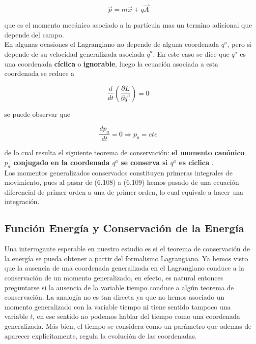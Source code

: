 \documentclass[12pt]{report}
\begin{document}
\begin{equation}
\vec{p}=m \vec{x} + q\vec{A}
\end{equation}


que es el momento mecánico asociado a la partícula mas un termino adicional que depende del campo. \\ 

En algunas ocasiones el Lagrangiano no depende de alguna coordenada $q^a$, pero si depende de su velocidad generalizada asociada $\dot{q}^a$. En este caso se dice que $q^a$ es una coordenada \textbf{cíclica} o \textbf{ignorable}, luego la ecuación asociada a esta coordenada se reduce a 

\begin{equation}
\frac{d}{dt} \left( \frac{\partial L}{\partial \dot{q}^a} \right) = 0
\end{equation}

se puede observar que 

\begin{equation}
\frac{dp_a}{dt} = 0 \Rightarrow p_a = cte
\end{equation}

de lo cual resulta el siguiente teorema de conservación: \textbf{ el momento canónico $p_{a}$ conjugado en la coordenada $q^a$ se conserva si $q^a$ es ciclica }. \\


Los momentos generalizados conservados constituyen primeras integrales de movimiento, pues al pasar de (6.108) a (6.109) hemos pasado de una ecuación diferencial de primer orden a una de primer orden, lo cual equivale a hacer una integración. \\




\subsection{Función Energía y Conservación de la Energía}


Una interrogante esperable en nuestro estudio es si el teorema de conservación de la energía se pueda obtener a partir del formalismo Lagrangiano. Ya hemos visto que la ausencia de una coordenada generalizada en el Lagrangiano conduce a la conservación de un momento generalizado, en efecto, es natural entonces preguntarse si la ausencia de la  variable tiempo conduce a algún teorema de conservación. La analogía no es tan directa ya que no hemos asociado un momento generalizado con la variable tiempo ni tiene sentido tampoco una variable $\dot{t}$, en ese sentido no podemos hablar del tiempo como una coordenada generalizada. Más bien, el tiempo se considera como un parámetro que ademas de aparecer explícitamente, regula la evolución de las coordenadas. 
\end{document}
